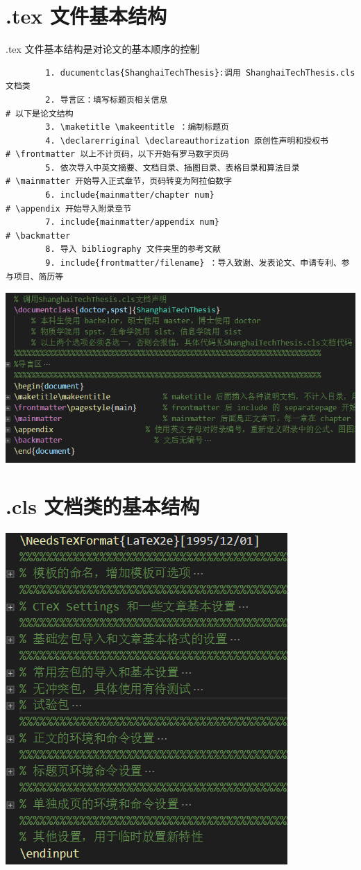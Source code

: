 \section{.tex 文件基本结构}
{\heiti .tex 文件基本结构是对论文的基本顺序的控制}
\begin{verbatim}
        1. ducumentclas{ShanghaiTechThesis}:调用 ShanghaiTechThesis.cls 文档类
        2. 导言区：填写标题页相关信息
# 以下是论文结构
        3. \maketitle \makeentitle ：编制标题页
        4. \declarerriginal \declareauthorization 原创性声明和授权书
# \frontmatter 以上不计页码，以下开始有罗马数字页码
        5. 依次导入中英文摘要、文档目录、插图目录、表格目录和算法目录
# \mainmatter 开始导入正式章节，页码转变为阿拉伯数字
        6. include{mainmatter/chapter num}
# \appendix 开始导入附录章节
        7. include{mainmatter/appendix num}
# \backmatter 
        8. 导入 bibliography 文件夹里的参考文献
        9. include{frontmatter/filename} ：导入致谢、发表论文、申请专利、参与项目、简历等
\end{verbatim}
\includegraphics{picture/tex.png}
\section{.cls 文档类的基本结构}
\includegraphics{picture/cls.png}
